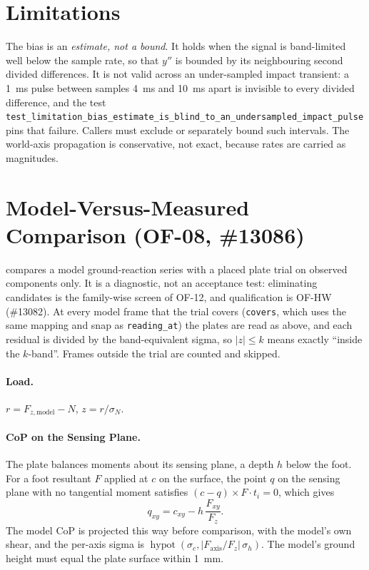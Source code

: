 \documentclass[11pt]{article}
\begin{document}
\section{Limitations}

The bias is an \emph{estimate, not a bound}. It holds when the signal is
band-limited well below the sample rate, so that $y''$ is bounded by its
neighbouring second divided differences. It is not valid across an
under-sampled impact transient: a 1~ms pulse between samples 4~ms and 10~ms
apart is invisible to every divided difference, and the test
\texttt{test\_limitation\_bias\_estimate\_is\_blind\_to\_an\_undersampled\_impact\_pulse}
pins that failure. Callers must exclude or separately bound such intervals.
The world-axis propagation is conservative, not exact, because rates are
carried as magnitudes.

\section{Model-Versus-Measured Comparison (OF-08, \#13086)}

 compares a model
ground-reaction series with a placed plate trial on observed components only.
It is a diagnostic, not an acceptance test: eliminating candidates is the
family-wise screen of OF-12, and qualification is OF-HW (\#13082). At every
model frame that the trial covers (\texttt{covers}, which uses the same
mapping and snap as \texttt{reading\_at}) the plates are read as above, and
each residual is divided by the band-equivalent sigma, so $|z| \le k$ means
exactly ``inside the $k$-band''. Frames outside the trial are counted and
skipped.

\paragraph{Load.} $r = F_{z,\mathrm{model}} - N$, $z = r/\sigma_N$.

\paragraph{CoP on the Sensing Plane.} The plate balances moments about its
sensing plane, a depth $h$ below the foot. For a foot resultant $F$ applied at
$c$ on the surface, the point $q$ on the sensing plane with no tangential
moment satisfies $(c-q)\times F \cdot t_i = 0$, which gives
\begin{equation}
  q_{xy} = c_{xy} - h\,\frac{F_{xy}}{F_z}.
\end{equation}
The model CoP is projected this way before comparison, with the model's own
shear, and the per-axis sigma is
$\operatorname{hypot}(\sigma_c, |F_{\mathrm{axis}}/F_z|\,\sigma_h)$. The model's
ground height must equal the plate surface within 1~mm.
\end{document}
